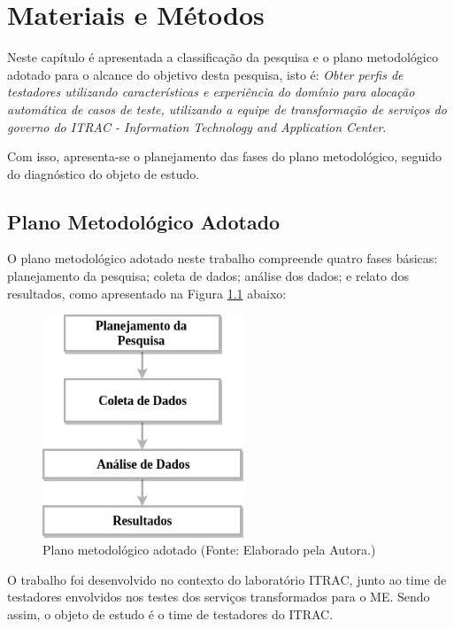 \chapter{Materiais e Métodos}
\label{ch:metodologia}

Neste capítulo é apresentada a classificação da pesquisa e o plano metodológico adotado para o alcance do objetivo desta pesquisa, isto é: \textit{Obter perfis de testadores utilizando características e experiência do domínio para alocação automática de casos de teste, utilizando a equipe de transformação de serviços do governo do ITRAC - Information Technology and Application Center}.

Com isso, apresenta-se o planejamento das fases do plano metodológico, seguido do diagnóstico do objeto de estudo.

\section{Plano Metodológico Adotado}
\label{sec:planMetodologico}

O plano metodológico adotado neste trabalho compreende quatro fases básicas: planejamento da pesquisa; coleta de dados; análise dos dados; e relato dos resultados, como apresentado  na Figura \ref{fig:PlanoGeral} abaixo:

        \begin{figure}[H]
          \centering
          \includegraphics[width=6cm]{figuras/planoGeral.png}
          \caption{Plano metodológico adotado (Fonte: Elaborado pela Autora.)} 
          \label{fig:PlanoGeral}
        
        \end{figure}

O trabalho foi desenvolvido no contexto do laboratório ITRAC, junto ao time de testadores envolvidos nos testes dos serviços transformados para o ME. Sendo assim, o objeto de estudo é o time de testadores do ITRAC.

